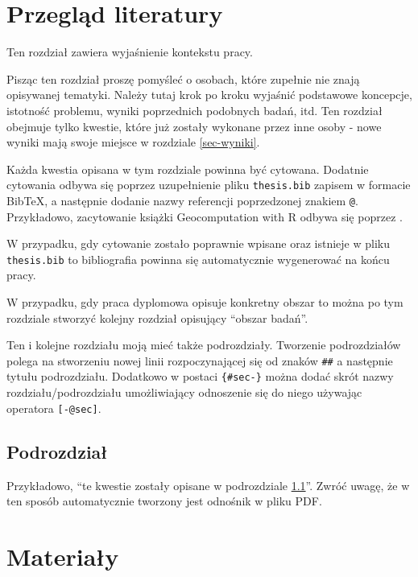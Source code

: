\documentclass{amuthesis}
\begin{document}
\hypertarget{sec-lit}{%
\chapter{Przegląd literatury}\label{sec-lit}}

Ten rozdział zawiera wyjaśnienie kontekstu pracy.

Pisząc ten rozdział proszę pomyśleć o osobach, które zupełnie nie znają
opisywanej tematyki. Należy tutaj krok po kroku wyjaśnić podstawowe
koncepcje, istotność problemu, wyniki poprzednich podobnych badań, itd.
Ten rozdział obejmuje tylko kwestie, które już zostały wykonane przez
inne osoby - nowe wyniki mają swoje miejsce w rozdziale
\ref{sec-wyniki}.

Każda kwestia opisana w tym rozdziale powinna być cytowana. Dodatnie
cytowania odbywa się poprzez uzupełnienie pliku \texttt{thesis.bib}
zapisem w formacie BibTeX, a następnie dodanie nazwy referencji
poprzedzonej znakiem \texttt{@}. Przykładowo, zacytowanie książki
Geocomputation with R odbywa się poprzez
\autocite{lovelace_geocomputation_2019}.

W przypadku, gdy cytowanie zostało poprawnie wpisane oraz istnieje w
pliku \texttt{thesis.bib} to bibliografia powinna się automatycznie
wygenerować na końcu pracy.

W przypadku, gdy praca dyplomowa opisuje konkretny obszar to można po
tym rozdziale stworzyć kolejny rozdział opisujący ``obszar badań''.

Ten i kolejne rozdziału moją mieć także podrozdziały. Tworzenie
podrozdziałów polega na stworzeniu nowej linii rozpoczynającej się od
znaków \texttt{\#\#} a następnie tytułu podrozdziału. Dodatkowo w
postaci \texttt{\{\#sec-\}} można dodać skrót nazwy
rozdziału/podrozdziału umożliwiający odnoszenie się do niego używając
operatora \texttt{{[}-@sec{]}}.

\hypertarget{sec-podr}{%
\section{Podrozdział}\label{sec-podr}}

Przykładowo, ``te kwestie zostały opisane w podrozdziale
\ref{sec-podr}''. Zwróć uwagę, że w ten sposób automatycznie tworzony
jest odnośnik w pliku PDF.


\hypertarget{sec-materialy}{%
\chapter{Materiały}\label{sec-materialy}}
\end{document}
